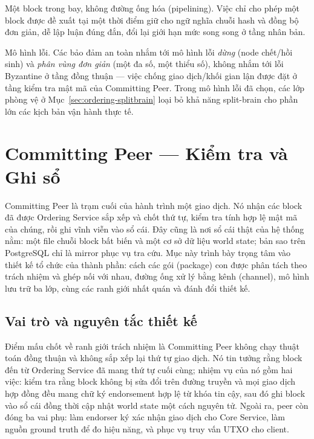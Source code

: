 Một block trong bay, không đường ống hóa (pipelining). Việc chỉ cho phép
một block được đề xuất tại một thời điểm giữ cho ngữ nghĩa chuỗi hash và đồng bộ
đơn giản, dễ lập luận đúng đắn, đổi lại giới hạn mức song song ở tầng nhân bản.

Mô hình lỗi. Các bảo đảm an toàn nhắm tới mô hình lỗi \textit{dừng} (node
chết/hồi sinh) và \textit{phân vùng đơn giản} (một đa số, một thiểu số), không nhắm
tới lỗi Byzantine ở tầng đồng thuận --- việc chống giao dịch/khối gian lận được đặt
ở tầng kiểm tra mật mã của Committing Peer. Trong mô hình lỗi đã chọn, các lớp
phòng vệ ở Mục~\ref{sec:ordering-splitbrain} loại bỏ khả năng split-brain cho phần
lớn các kịch bản vận hành thực tế.


\section{Committing Peer --- Kiểm tra và Ghi sổ}
\label{sec:committing-peer}

Committing Peer là trạm cuối của hành trình một giao dịch. Nó nhận các block đã
được Ordering Service sắp xếp và chốt thứ tự, kiểm tra tính hợp lệ mật mã của
chúng, rồi ghi vĩnh viễn vào sổ cái. Đây cũng là nơi sổ cái thật của hệ thống
nằm: một file chuỗi block bất biến và một cơ sở dữ liệu world state; bản sao
trên PostgreSQL chỉ là mirror phục vụ tra cứu. Mục này trình bày trọng tâm vào
thiết kế tổ chức của thành phần: cách các gói (package) con được phân tách
theo trách nhiệm và ghép nối với nhau, đường ống xử lý bằng kênh (channel), mô
hình lưu trữ ba lớp, cùng các ranh giới nhất quán và đánh đổi thiết kế.

\subsection{Vai trò và nguyên tắc thiết kế}
\label{sec:cp-role}

Điểm mấu chốt về ranh giới trách nhiệm là Committing Peer không chạy thuật
toán đồng thuận và không sắp xếp lại thứ tự giao dịch. Nó tin tưởng rằng block
đến từ Ordering Service đã mang thứ tự cuối cùng; nhiệm vụ của nó gồm hai
việc: kiểm tra rằng block không bị sửa đổi trên đường truyền và mọi giao dịch
hợp đồng đều mang chữ ký endorsement hợp lệ từ khóa tin cậy, sau đó ghi block
vào sổ cái đồng thời cập nhật world state một cách nguyên tử. Ngoài ra, peer
còn đóng ba vai phụ: làm endorser ký xác nhận giao dịch cho Core Service, làm
nguồn ground truth để đo hiệu năng, và phục vụ truy vấn UTXO cho client.

